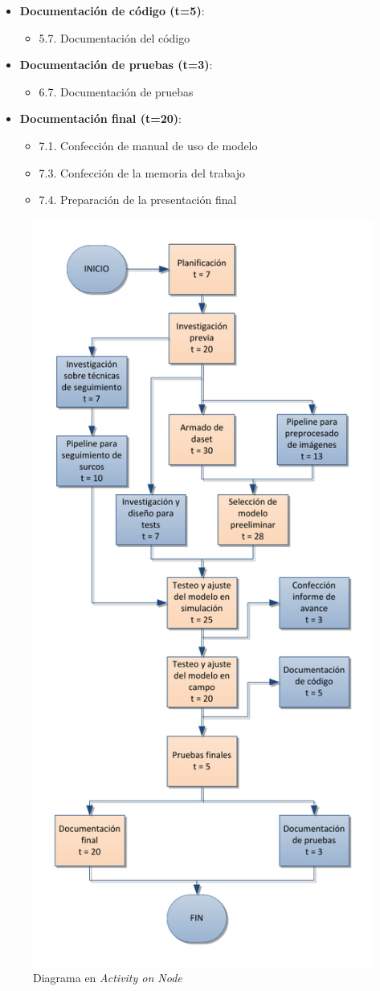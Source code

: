 \documentclass[
11pt, %
codirector, %
]{charter}
\begin{document}
\begin{itemize}
\item \textbf{Documentación de código (t=5)}:
\begin{itemize}
\item 5.7. Documentación del código
\end{itemize}

\item \textbf{Documentación de pruebas (t=3)}:
\begin{itemize}
\item 6.7. Documentación de pruebas
\end{itemize}

\item \textbf{Documentación final (t=20)}:
\begin{itemize}
\item 7.1. Confección de manual de uso de modelo
\item 7.3. Confección de la memoria del trabajo
\item 7.4. Preparación de la presentación final
\end{itemize}

\end{itemize}

\begin{figure}[htpb]
\centering 
\includegraphics[width=.65\textwidth]{./Figuras/aon.pdf}
\caption{Diagrama en \textit{Activity on Node}}
\label{fig:aon}
\end{figure}
\end{document}
